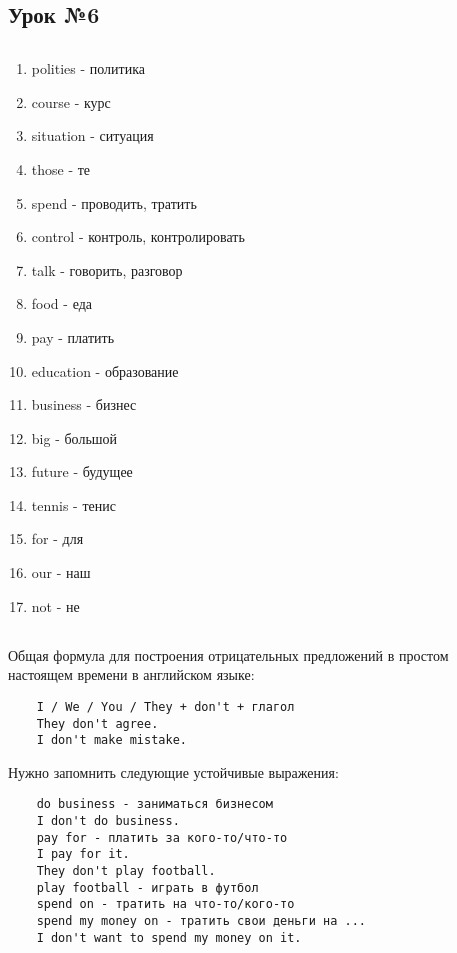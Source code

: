 \subsection{Урок №6}

\subsection*{}
\begin{multicols}{2}
    \begin{enumerate}\setlength{\itemsep}{0pt}
        \item polities - политика
        \item course - курс
        \item situation - ситуация
        \item those - те
        \item spend - проводить, тратить
        \item control - контроль, контролировать
        \item talk - говорить, разговор
        \item food - еда
        \item pay - платить
        \item education - образование
        \item business - бизнес
        \item big - большой
        \item future - будущее
        \item tennis - тенис
        \item for - для
        \item our - наш
        \item not - не
    \end{enumerate}
\end{multicols}

\subsection*{}
Общая формула для построения отрицательных предложений в простом настоящем времени в английском языке:
\begin{verbatim}
    I / We / You / They + don't + глагол
    They don't agree.
    I don't make mistake.
\end{verbatim}

Нужно запомнить следующие устойчивые выражения:
\begin{verbatim}
    do business - заниматься бизнесом
    I don't do business.
    pay for - платить за кого-то/что-то
    I pay for it.
    They don't play football.
    play football - играть в футбол
    spend on - тратить на что-то/кого-то
    spend my money on - тратить свои деньги на ...
    I don't want to spend my money on it.
\end{verbatim}